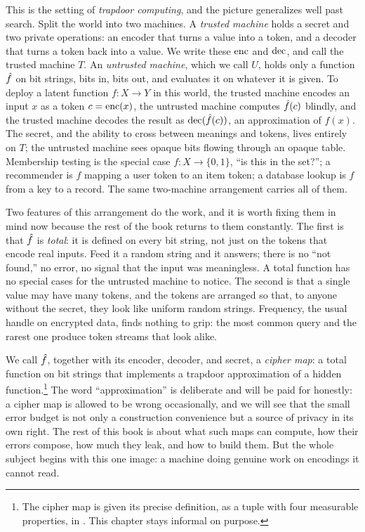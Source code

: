 This is the setting of \emph{trapdoor computing}, and the picture
generalizes well past search. Split the world into two machines. A
\emph{trusted machine} holds a secret and two private operations: an
encoder that turns a value into a token, and a decoder that turns a token
back into a value. We write these $\operatorname{enc}$ and $\operatorname{dec}$, and call the trusted
machine $T$. An \emph{untrusted machine}, which we call $U$, holds only a
function $\hat{f}$ on bit strings, bits in, bits out, and evaluates it on
whatever it is given. To deploy a latent function $f : X \to Y$ in this
world, the trusted machine encodes an input $x$ as a token $c = \operatorname{enc}(x)$,
the untrusted machine computes $\hat{f}(c)$ blindly, and the trusted machine
decodes the result as $\operatorname{dec}(\hat{f}(c))$, an approximation of $f(x)$. The
secret, and the ability to cross between meanings and tokens, lives
entirely on $T$; the untrusted machine sees opaque bits flowing through an
opaque table. Membership testing is the special case $f : X \to \{0,1\}$,
``is this in the set?''; a recommender is $f$ mapping a user token to an
item token; a database lookup is $f$ from a key to a record. The same
two-machine arrangement carries all of them.

Two features of this arrangement do the work, and it is worth fixing them
in mind now because the rest of the book returns to them constantly. The
first is that $\hat{f}$ is \emph{total}: it is defined on every bit string,
not just on the tokens that encode real inputs. Feed it a random string and
it answers; there is no ``not found,'' no error, no signal that the input
was meaningless. A total function has no special cases for the untrusted
machine to notice. The second is that a single value may have many tokens,
and the tokens are arranged so that, to anyone without the secret, they
look like uniform random strings. Frequency, the usual handle on encrypted
data, finds nothing to grip: the most common query and the rarest one
produce token streams that look alike.

We call $\hat{f}$, together with its encoder, decoder, and secret, a
\emph{cipher map}: a total function on bit strings that implements a
trapdoor approximation of a hidden function.\footnote{The cipher map is
given its precise definition, as a tuple with four measurable properties,
in . This chapter stays informal on purpose.} The
word ``approximation'' is deliberate and will be paid for honestly: a
cipher map is allowed to be wrong occasionally, and we will see that the
small error budget is not only a construction convenience but a source of
privacy in its own right. The rest of this book is about what such maps can
compute, how their errors compose, how much they leak, and how to build
them. But the whole subject begins with this one image: a machine doing
genuine work on encodings it cannot read.

